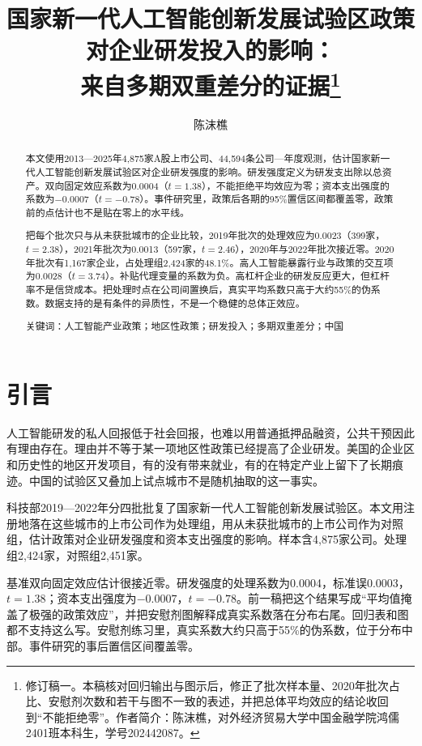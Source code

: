 \documentclass[12pt,hyperref,a4paper,UTF8]{ctexart}
\title{\songti\bfseries\zihao{2} 国家新一代人工智能创新发展试验区政策对企业研发投入的影响：\\来自多期双重差分的证据\thanks{修订稿一。本稿核对回归输出与图示后，修正了批次样本量、2020年批次占比、安慰剂次数和若干与图不一致的表述，并把总体平均效应的结论收回到“不能拒绝零”。作者简介：陈沫樵，对外经济贸易大学中国金融学院鸿儒2401班本科生，学号202442087。}}
\author{\songti\zihao{4} 陈沫樵}
\date{}
\begin{document}
\maketitle

\begin{abstract}
本文使用2013—2025年4,875家A股上市公司、44,594条公司—年度观测，估计国家新一代人工智能创新发展试验区对企业研发强度的影响。研发强度定义为研发支出除以总资产。双向固定效应系数为0.0004（$t=1.38$），不能拒绝平均效应为零；资本支出强度的系数为$-0.0007$（$t=-0.78$）。事件研究里，政策后各期的95\%置信区间都覆盖零，政策前的点估计也不是贴在零上的水平线。

把每个批次只与从未获批城市的企业比较，2019年批次的处理效应为0.0023（399家，$t=2.38$），2021年批次为0.0013（597家，$t=2.46$），2020年与2022年批次接近零。2020年批次有1,167家企业，占处理组2,424家的48.1\%。高人工智能暴露行业与政策的交互项为0.0028（$t=3.74$）。补贴代理变量的系数为负。高杠杆企业的研发反应更大，但杠杆率不是信贷成本。把处理时点在公司间置换后，真实平均系数只高于大约55\%的伪系数。数据支持的是有条件的异质性，不是一个稳健的总体正效应。

{\heiti 关键词：}人工智能产业政策；地区性政策；研发投入；多期双重差分；中国
\end{abstract}

\section{引\quad 言}

人工智能研发的私人回报低于社会回报，也难以用普通抵押品融资，公共干预因此有理由存在\parencite{hall2010financing}。理由并不等于某一项地区性政策已经提高了企业研发。美国的企业区和历史性的地区开发项目，有的没有带来就业\parencite{neumark2011enterprise}，有的在特定产业上留下了长期痕迹\parencite{kline2014local}。中国的试验区又叠加上试点城市不是随机抽取的这一事实\parencite{wang2021experimentation}。

科技部2019—2022年分四批批复了国家新一代人工智能创新发展试验区。本文用注册地落在这些城市的上市公司作为处理组，用从未获批城市的上市公司作为对照组，估计政策对企业研发强度和资本支出强度的影响。样本含4,875家公司。处理组2,424家，对照组2,451家。

基准双向固定效应估计很接近零。研发强度的处理系数为0.0004，标准误0.0003，$t=1.38$；资本支出强度为$-0.0007$，$t=-0.78$。前一稿把这个结果写成“平均值掩盖了极强的政策效应”，并把安慰剂图解释成真实系数落在分布右尾。回归表和图都不支持这么写。安慰剂练习里，真实系数大约只高于55\%的伪系数，位于分布中部。事件研究的事后置信区间覆盖零。
\end{document}
